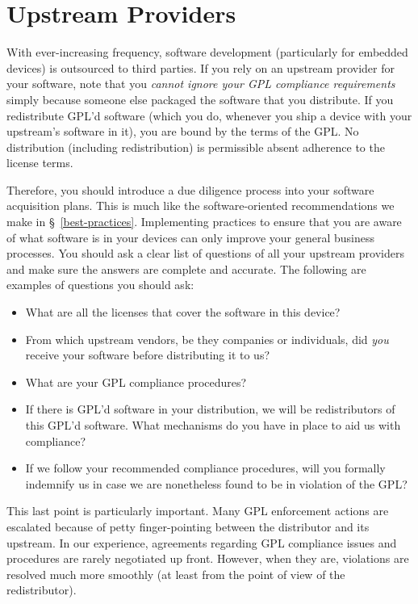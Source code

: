 \section{Upstream Providers}
\label{upstream}

With ever-increasing frequency, software development (particularly for
embedded devices) is outsourced to third parties.  If you rely on an
upstream provider for your software, note that you \emph{cannot ignore
  your GPL compliance requirements} simply because someone else packaged
the software that you distribute.  If you redistribute GPL'd software
(which you do, whenever you ship a device with your upstream's software in
it), you are bound by the terms of the GPL\@.  No distribution (including
redistribution) is permissible absent adherence to the license terms.

Therefore, you should introduce a due diligence process into your software
acquisition plans.  This is much like the software-oriented
recommendations we make in \S~\ref{best-practices}.  Implementing
practices to ensure that you are aware of what software is in your devices
can only improve your general business processes.  You should ask a clear
list of questions of all your upstream providers and make sure the answers
are complete and accurate.  The following are examples of questions you
should ask:
\begin{itemize}

\item What are all the licenses that cover the software in this device?

\item From which upstream vendors, be they companies or individuals, did
  \emph{you} receive your software before distributing it to us?

\item What are your GPL compliance procedures?

\item If there is GPL'd software in your distribution, we will be
  redistributors of this GPL'd software.  What mechanisms do you have in
  place to aid us with compliance?

\item If we follow your recommended compliance procedures, will you
  formally indemnify us in case we are nonetheless found to be in
  violation of the GPL?

\end{itemize}

This last point is particularly important.  Many GPL enforcement actions are
escalated because of petty finger-pointing between the distributor and its
upstream.  In our experience, agreements regarding GPL compliance issues
and procedures are rarely negotiated up front.  However, when they are,
violations are resolved much more smoothly (at least from the point of
view of the redistributor).

